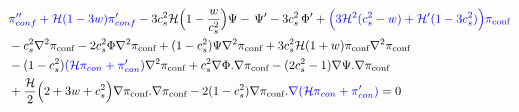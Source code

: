 \documentclass[a4paper,11pt]{article}
\begin{document}
 \begin{align} 
 &{\color{blue}\pi''_{conf} +\mathcal{H}(1- 3w) \pi'_{conf} } -3 { c_s^2 \mathcal{H}}\Big( 1- \frac{w}{c_s^2} \Big )\Psi - \, {\Psi'}- 3 c_s^2  \,{\Phi'} + {\color{blue}
 \Big( 3\mathcal{H}^2 (c_s^2 -w) + \mathcal{H}' (1-3c_s^2)\Big) \pi_{\text{conf}} }
           \nonumber
   \\
    &
 - c_s^2 {\nabla^2 \pi_{\text{conf}} }
     -2 c_s^2  \Phi  {\nabla^2 \pi_{\text{conf}} }  
  +   (1-c_s^2)  \Psi {\nabla^2 \pi_{\text{conf}} }
  +3 c_s^2 \mathcal{H} (1+w)\pi_{\text{conf}} {\nabla^2 \pi_{\text{conf}} }
                                      \nonumber
   \\
    &
        -   (1-c_s^2)  { \color{blue}(\mathcal{H} \pi_{con}+ \pi'_{con}) } \nabla^2 {\pi_{\text{conf}} }
             +c_s^2 {\nabla  \Phi . \nabla \pi_{\text{conf}} }
        -(2 c_s^2-1) {\nabla  \Psi . \nabla \pi_{\text{conf}} }  
                                    \nonumber
   \\
    &
 +\frac{\mathcal{H}} {2 } \Big(2+3w+c_s^2  \Big){\nabla  \pi_{\text{conf}} . \nabla \pi_{\text{conf}} } 
     -2   (1-c_s^2){\nabla  \pi_{\text{conf}} . {\color{blue}  \nabla {  (\mathcal{H} \pi_{con}+ \pi'_{con})   }}}     =0
  \end{align} 
\end{document}
